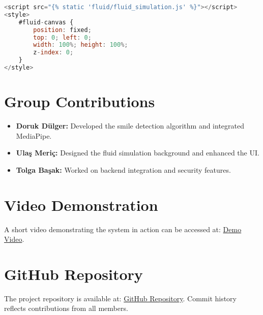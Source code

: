 \documentclass[12pt]{article}
\begin{document}
\begin{lstlisting}[language=JavaScript, caption=Fluid Simulation]
<script src="{% static 'fluid/fluid_simulation.js' %}"></script>
<style>
    #fluid-canvas {
        position: fixed;
        top: 0; left: 0;
        width: 100%; height: 100%;
        z-index: 0;
    }
</style>
\end{lstlisting}

\section{Group Contributions}
\begin{itemize}
    \item \textbf{Doruk Dülger:} Developed the smile detection algorithm and integrated MediaPipe.
    \item \textbf{Ulaş Meriç:} Designed the fluid simulation background and enhanced the UI.
    \item \textbf{Tolga Başak:} Worked on backend integration and security features.
\end{itemize}

\section{Video Demonstration}
A short video demonstrating the system in action can be accessed at: \href{https://your-video-link.com}{Demo Video}.

\section{GitHub Repository}
The project repository is available at: \href{https://github.com/your-repo-link}{GitHub Repository}. Commit history reflects contributions from all members.
\end{document}

